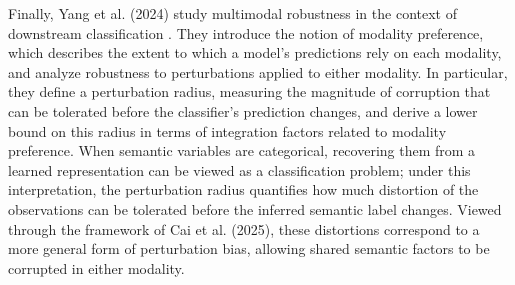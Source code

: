 \documentclass[a4paper,12pt]{article}
\begin{document}
Finally, Yang et al. (2024) study multimodal robustness in the context of downstream classification \cite{ICLR2024_45a9d429}. They introduce the notion of modality preference, which describes the extent to which a model’s predictions rely on each modality, and analyze robustness to perturbations applied to either modality. In particular, they define a perturbation radius, measuring the magnitude of corruption that can be tolerated before the classifier’s prediction changes, and derive a lower bound on this radius in terms of integration factors related to modality preference. When semantic variables are categorical, recovering them from a learned representation can be viewed as a classification problem; under this interpretation, the perturbation radius quantifies how much distortion of the observations can be tolerated before the inferred semantic label changes. Viewed through the framework of Cai et al. (2025), these distortions correspond to a more general form of perturbation bias, allowing shared semantic factors to be corrupted in either modality.


\newpage


\end{document}
